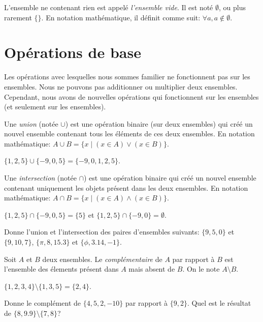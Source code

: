 \begin{definition}
    L'ensemble ne contenant rien est appelé \emph{l'ensemble vide}. Il est noté $\emptyset$, ou plus rarement $\{\}$. En notation mathématique, il définit comme suit: $\forall a, a\not\in \emptyset$.
\end{definition}

\section{Opérations de base}

Les opérations avec lesquelles nous sommes familier ne fonctionnent pas sur les ensembles. Nous ne pouvons pas additionner ou multiplier deux ensembles. Cependant, nous avons de nouvelles opérations qui fonctionnent sur les ensembles (et seulement sur les ensembles).

\begin{definition}
    Une \emph{union} (notée $\cup$) est une opération binaire (sur deux ensembles) qui créé un nouvel ensemble contenant tous les éléments de ces deux ensembles. En notation mathématique: $A \cup B = \{x \mid (x\in A) \vee (x\in B)\}$.
\end{definition}
\begin{exemple}
    $\{1, 2, 5\} \cup \{-9, 0, 5\} = \{-9, 0, 1, 2, 5\}$.
\end{exemple}

\begin{definition}
    Une \emph{intersection} (notée $\cap$) est une opération binaire qui créé un nouvel ensemble contenant uniquement les objets présent dans les deux ensembles. En notation mathématique: $A \cap B = \{x\mid (x\in A) \wedge (x\in B) \}$.
\end{definition}
\begin{exemple}
    $\{1, 2, 5\} \cap \{-9, 0, 5\} = \{5\}$ et $\{1, 2, 5\} \cap \{-9, 0\} = \emptyset$.
\end{exemple}
\begin{exercice}
    Donne l'union et l'intersection des paires d'ensembles suivants: $\{9, 5, 0\}$ et $\{9, 10, 7\}$, $\{\pi, 8, 15.3\}$ et $\{\phi, 3.14, -1\}$.
\end{exercice}

\begin{definition}
    Soit $A$ et $B$ deux ensembles. Le \emph{complémentaire} de $A$ par rapport à $B$ est l'ensemble des élements présent dans $A$ mais absent de $B$. On le note $A\setminus B$.
\end{definition}
\begin{exemple}
    $\{1, 2, 3, 4\} \setminus \{1, 3, 5\} = \{2, 4\}$.
\end{exemple}
\begin{exercice}
    Donne le complément de $\{4, 5, 2, -10\}$ par rapport à $\{9, 2\}$. Quel est le résultat de $\{8, 9.9\} \setminus \{7, 8\}$?
\end{exercice}

